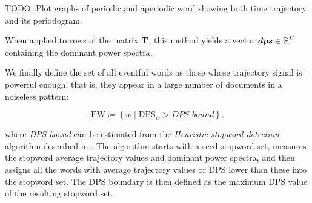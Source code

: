 {\color{red} TODO: Plot graphs of periodic and aperiodic word showing both time trajectory and its periodogram.}

When applied to rows of the matrix $\mathbf{T}$, this method yields a vector $\vect{DPS} \in \R^{\featcount}$ containing the dominant power spectra.

We finally define the set of all eventful words as those whose trajectory signal is powerful enough, that is, they appear in a large number of documents in a noiseless pattern:

\begin{equation}
	\text{EW} \coloneqq \left\{ w \mid \text{DPS}_{w} > \textit{DPS-bound} \right\}.
\end{equation}

where \textit{DPS-bound} can be estimated from the \textit{Heuristic stopword detection} algorithm described in \cite{event-detection}. The algorithm starts with a seed stopword set, measures the stopword average trajectory  values and dominant power spectra, and then assigns all the words with average trajectory values or DPS lower than these into the stopword set. The DPS boundary is then defined as the maximum DPS value of the resulting stopword set.